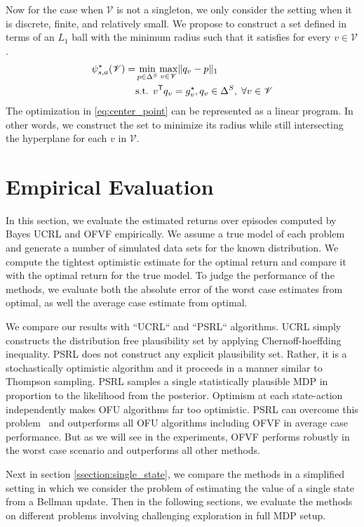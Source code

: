 \documentclass{article}
\DeclarePairedDelimiter{\norm}{\lVert}{\rVert}
\newcommand{\opt}{^\star}
\newcommand{\tr}{^{\mathsf{T}}}
\newcommand{\vset}{\mathcal{V}}
\theoremstyle{plain}
\theoremstyle{definition}
\begin{document}
Now for the case when $\mathcal{V}$ is not a singleton, we only consider the setting when it is discrete, finite, and relatively small. We propose to construct a set defined in terms of an $L_1$ ball with the minimum radius such that it satisfies for every $v\in\mathcal{V}$.
\begin{equation} \label{eq:center_point}
\begin{split}
\psi_{s,a}\opt(\mathcal{V}) = & \min_{p\in\Delta^S} \max_{v\in\vset} \norm{q_v - p}_1 \\
& \text{s.t. } v\tr  q_v = g_{v}\opt, q_v \in \Delta^S, \; \forall v \in\vset
\end{split}
\end{equation}
The optimization in \eqref{eq:center_point} can be represented as a linear program. In other words, we construct the set to minimize its radius while still intersecting the hyperplane for each $v$ in $\vset$.

\section{Empirical Evaluation} \label{sec:experiments}

In this section, we evaluate the estimated returns over episodes computed by Bayes UCRL and OFVF empirically. We assume a true model of each problem and generate a number of simulated data sets for the known distribution. We compute the tightest optimistic estimate for the optimal return and compare it with the optimal return for the true model. To judge the performance of the methods, we evaluate both the absolute error of the worst case estimates from optimal, as well the average case estimate from optimal.

We compare our results with ``UCRL`` and ``PSRL`` algorithms. UCRL simply constructs the distribution free plausibility set by applying Chernoff-hoeffding inequality. PSRL does not construct any explicit plausibility set. Rather, it is a stochastically optimistic algorithm and it proceeds in a manner similar to Thompson sampling. PSRL samples a single statistically plausible MDP in proportion to the likelihood from the posterior. Optimism at each state-action independently makes OFU algorithms far too optimistic. PSRL can overcome this problem~\cite{Osband2016} and outperforms all OFU algorithms including OFVF in average case performance. But as we will see in the experiments, OFVF performs robustly in the worst case scenario and outperforms all other methods.

Next in section \cref{ssection:single_state}, we compare the methods in a simplified setting in which we consider the problem of estimating the value of a single state from a Bellman update. Then in the following sections, we evaluate the methods on different problems involving challenging exploration in full MDP setup.
\end{document}
